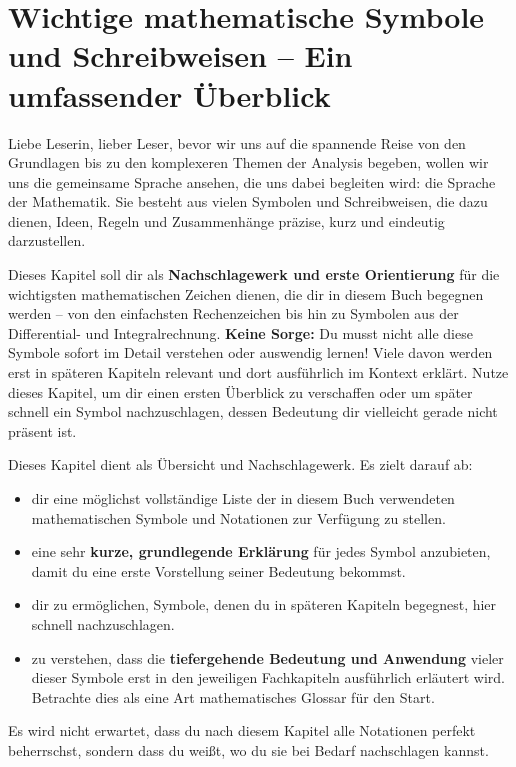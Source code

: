 
\section{Wichtige mathematische Symbole und Schreibweisen – Ein umfassender Überblick}
\label{sec:notationen_ueberblick_umfassend}

Liebe Leserin, lieber Leser,
bevor wir uns auf die spannende Reise von den Grundlagen bis zu den komplexeren Themen der Analysis begeben, wollen wir uns die gemeinsame Sprache ansehen, die uns dabei begleiten wird: die Sprache der Mathematik. Sie besteht aus vielen Symbolen und Schreibweisen, die dazu dienen, Ideen, Regeln und Zusammenhänge präzise, kurz und eindeutig darzustellen.

Dieses Kapitel soll dir als \textbf{Nachschlagewerk und erste Orientierung} für die wichtigsten mathematischen Zeichen dienen, die dir in diesem Buch begegnen werden – von den einfachsten Rechenzeichen bis hin zu Symbolen aus der Differential- und Integralrechnung.
\textbf{Keine Sorge:} Du musst nicht alle diese Symbole sofort im Detail verstehen oder auswendig lernen! Viele davon werden erst in späteren Kapiteln relevant und dort ausführlich im Kontext erklärt. Nutze dieses Kapitel, um dir einen ersten Überblick zu verschaffen oder um später schnell ein Symbol nachzuschlagen, dessen Bedeutung dir vielleicht gerade nicht präsent ist.

\begin{tcolorbox}[colback=blue!5!white, colframe=blue!75!black, title=Was du in diesem Kapitel (als Referenz) finden wirst:]
Dieses Kapitel dient als Übersicht und Nachschlagewerk. Es zielt darauf ab:
\begin{itemize}[noitemsep, topsep=0pt, leftmargin=*, itemsep=2pt]
    \item dir eine möglichst vollständige Liste der in diesem Buch verwendeten mathematischen Symbole und Notationen zur Verfügung zu stellen.
    \item eine sehr \textbf{kurze, grundlegende Erklärung} für jedes Symbol anzubieten, damit du eine erste Vorstellung seiner Bedeutung bekommst.
    \item dir zu ermöglichen, Symbole, denen du in späteren Kapiteln begegnest, hier schnell nachzuschlagen.
    \item zu verstehen, dass die \textbf{tiefergehende Bedeutung und Anwendung} vieler dieser Symbole erst in den jeweiligen Fachkapiteln ausführlich erläutert wird. Betrachte dies als eine Art mathematisches Glossar für den Start.
\end{itemize}
Es wird nicht erwartet, dass du nach diesem Kapitel alle Notationen perfekt beherrschst, sondern dass du weißt, wo du sie bei Bedarf nachschlagen kannst.
\end{tcolorbox}
\bigskip

